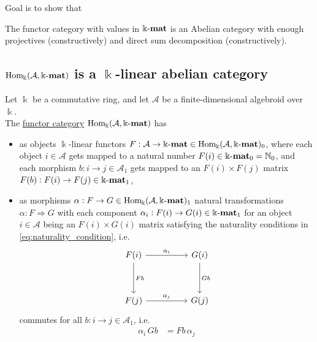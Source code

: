 \label{sect:abelian_cat}
Goal is to show that

The functor category with values in $\Bbbk\textnormal{-}\mathbf{mat}$ is an Abelian category with enough projectives (constructively) and direct sum decomposition (constructively).

\subsection{$\mathrm{Hom_{\Bbbk}}(\mathcal{A},\Bbbk\textnormal{-}\mathbf{mat})$ is a $\Bbbk$-linear abelian category}

\begin{definition}
Let $\Bbbk$ be a commutative ring, and let $\mathcal{A}$ be a finite-dimensional algebroid over $\Bbbk$.\\
The \ul{functor category} $\mathrm{Hom_{\Bbbk}}(\mathcal{A},\Bbbk\textnormal{-}\mathbf{mat})$ has
\begin{itemize}
\item as objects $\Bbbk$-linear functors $F : \mathcal{A} \rightarrow \Bbbk\textnormal{-}\mathbf{mat} \in \mathrm{Hom_{\Bbbk}}(\mathcal{A},\Bbbk\textnormal{-}\mathbf{mat})_{0}$, where each
object $i \in \mathcal{A}$ gets mapped to a natural number $F(i) \in \Bbbk\textnormal{-}\mathbf{mat}_{0} = \mathbb{N}_{0}$, and each
morphism $b : i \rightarrow j \in \mathcal{A}_{1}$ gets mapped to an $F(i) \times F(j)$ matrix
$F(b) : F(i) \rightarrow F(j) \in \Bbbk\textnormal{-}\mathbf{mat}_{1}$,
\item as morphisms $\alpha : F \rightarrow G \in \mathrm{Hom_{\Bbbk}}(\mathcal{A},\Bbbk\textnormal{-}\mathbf{mat})_{1}$ natural transformations $\alpha : F \Rightarrow G$ with each component
$\alpha_{i} : F(i) \rightarrow G(i) \in \Bbbk\textnormal{-}\mathbf{mat}_{1}$ for an object $i \in \mathcal{A}$ being an $F(i) \times G(i)$ matrix satisfying the
naturality conditions in \eqref{eq:naturality_condition}, i.e.
\[
\begin{tikzcd}
F(i) \arrow[rr, "\alpha_{i}"] \arrow[dd, "Fb"] &  & G(i) \arrow[dd, "Gb"] \\
                                             &  &                     \\
F(j) \arrow[rr, "\alpha_{j}"]                &  & G(j)                
\end{tikzcd}
\]
commutes for all $b : i \rightarrow j \in \mathcal{A}_{1}$, i.e.
\begin{align}
\alpha_{i}\,Gb &= Fb\,\alpha_{j}
\end{align}
\end{itemize}
\end{definition}

